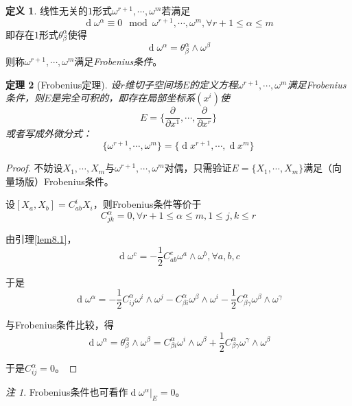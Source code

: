 \documentclass[winfonts,UTF8,c5size,a4paper,fancyhdr,hyperref,titlepage,nocap]{ctexart}
\newtheorem{thm}{定理}
\theoremstyle{definition}
\newtheorem{defn}[thm]{定义}
\theoremstyle{remark}
\newtheorem*{rem}{注}
\numberwithin{equation}{subsection}
\newcommand{\red}{\color{red}}
\newcommand{\dd}{\operatorname{d}}
\newcommand{\pfrac}[2]{\frac{\partial{#1}}{\partial{#2}}}
\newcommand{\local}[2]{\left.{#1}\right|_{#2}}%
\begin{document}
\begin{defn}
  线性无关的$1$形式$\omega^{r+1},\cdots,\omega^m$若满足
\begin{equation*}
\dd\omega^{\alpha}\equiv0\mod\omega^{r+1},\cdots,\omega^m, \forall r+1\leqslant\alpha\leqslant m
\end{equation*}
即存在$1$形式$\theta^{\alpha}_{\beta}$使得
\begin{equation*}
\dd\omega^{\alpha}=\theta^{\alpha}_{\beta}\wedge\omega^{\beta}
\end{equation*}
则称$\omega^{r+1},\cdots,\omega^m$满足\emph{\red Frobenius条件}。
\end{defn}
\begin{thm}[Frobenius定理]
设$r$维切子空间场$E$的定义方程$\omega^{r+1},\cdots,\omega^m$满足Frobenius条件，则$E$是完全可积的，即存在局部坐标系$(x^i)$使
\begin{equation*}
E=\{\pfrac{}{x^1},\cdots,\pfrac{}{x^r}\}
\end{equation*}
或者写成外微分式：
\begin{equation*}
\{\omega^{r+1},\cdots,\omega^m\}=\{\dd x^{r+1},\cdots,\dd x^m\}
\end{equation*}
\end{thm}
\begin{proof}
  不妨设$X_1,\cdots,X_m$与$\omega^{r+1},\cdots,\omega^m$对偶，只需验证$E=\{X_1,\cdots,X_m\}$满足（向量场版）Frobenius条件。

设$[X_a,X_b]=C^i_{ab}X_i$，则Frobenius条件等价于
\begin{equation*}
C^{\alpha}_{jk}=0,\forall r+1\leqslant\alpha\leqslant m, 1\leqslant j,k\leqslant r
\end{equation*}

由引理\ref{lem8.1}，
\begin{equation*}
\dd\omega^c=-\frac{1}{2}C^c_{ab}\omega^a\wedge\omega^b,\forall a,b,c
\end{equation*}

于是
\begin{equation*}
\dd\omega^{\alpha}=-\frac{1}{2}C^{\alpha}_{ij}\omega^i\wedge\omega^j-C^{\alpha}_{\beta i}\omega^{\beta}\wedge\omega^i-\frac{1}{2}C^{\alpha}_{\beta\gamma}\omega^{\beta}\wedge\omega^{\gamma}
\end{equation*}

与Frobenius条件比较，得
\begin{equation*}
\dd\omega^{\alpha}=\theta^{\alpha}_{\beta}\wedge\omega^{\beta}=C^{\alpha}_{\beta i}\omega^i\wedge\omega^{\beta}+\frac{1}{2}C^{\alpha}_{\beta\gamma}\omega^{\gamma}\wedge\omega^{\beta}
\end{equation*}

于是$C^{\alpha}_{ij}=0$。
\end{proof}
\begin{rem}
  Frobenius条件也可看作$\local{\dd\omega^{\alpha}}{E}=0$。
\end{rem}
\end{document}
